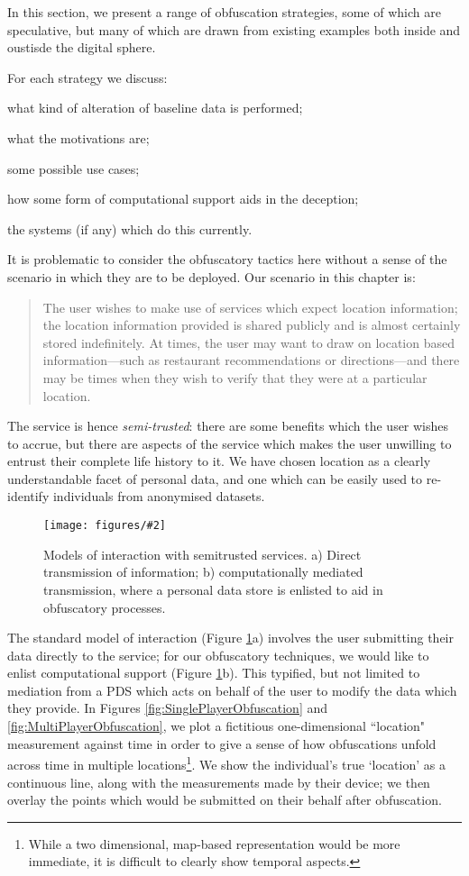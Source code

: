 \documentclass{IOS-Book-Article}     %
\newcommand{\fig}[3][0.9]{
\begin{figure}[tp]
\begin{center}
\texttt{[image: figures/\#2]}
\caption{#3}
\label{fig:#2}
\end{center}
\end{figure}
}
\begin{document}
In this section, we present a range of obfuscation strategies, some of which are
speculative, but many of which are drawn from existing examples both inside and
oustisde the digital sphere.

For each strategy we discuss: \begin{inparaenum}
\item what kind of alteration of baseline data is performed;
\item what the motivations are;
\item some possible use cases;
\item how some form of computational support aids in the deception;
\item the systems (if any) which do this currently.
\end{inparaenum}


It is problematic to consider the obfuscatory tactics here without a sense of
the scenario in which they are to be deployed. Our scenario in this chapter is:
\begin{quote}
The user wishes to make use of services which expect location information; 
the location information provided is shared publicly and is almost
certainly stored indefinitely. At times, the user may want to draw on location
based information---such as restaurant recommendations or directions---and there
may be times when they wish to verify that they were at a particular location.
\end{quote}
The service is hence \emph{semi-trusted}: there are some benefits which the user
wishes to accrue, but there are aspects of the service which makes the user
unwilling to entrust their complete life history to it. We have chosen location
as a clearly understandable facet of personal data, and one which can be easily
used to re-identify individuals from anonymised
datasets\cite{montjoye2013Unique}.

\fig{Mediation}{Models of interaction with semitrusted services. a) Direct
transmission of information; b) computationally mediated transmission, where a
personal data store is enlisted to aid in obfuscatory processes.}

The standard model of interaction (Figure \ref{fig:Mediation}a) involves the
user submitting their data directly to the service; for our obfuscatory
techniques, we would like to enlist computational support (Figure
\ref{fig:Mediation}b). This typified, but not limited to mediation from a PDS
which acts on behalf of the user to modify the data which they provide.
In Figures \ref{fig:SinglePlayerObfuscation} and
\ref{fig:MultiPlayerObfuscation}, we plot a fictitious one-dimensional
``location" measurement against time in order to give a sense of how
obfuscations unfold across time in multiple locations\footnote{While a two
dimensional, map-based representation would be more immediate, it is difficult
to clearly show temporal aspects.}. We show the individual's true `location' as
a continuous line, along with the measurements made by their device; we then
overlay the points which would be submitted on their behalf after obfuscation.
\end{document}
